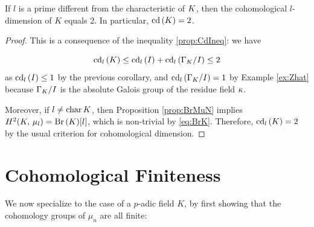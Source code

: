 \documentclass[a4paper, oneside]{memoir}
\begin{document}
\begin{theorem}\label{thm:CohomFin}
	If $l$ is a prime different from the characteristic of $K$, then the cohomological $l$-dimension of $K$ equals 2. In particular, $\operatorname{cd}{(K)}=2$.
\end{theorem}

\begin{proof}
	This is a consequence of the inequality \ref{prop:CdIneq}: we have

	\[
		\operatorname{cd}_l{(K)}\leq \operatorname{cd}_l{(I)}+\operatorname{cd}_l{(\Gamma_K / I)} \leq 2
	\]
	as $\operatorname{cd}_l{(I)}\leq 1$ by the previous corollary, and $\operatorname{cd}_l{(\Gamma_K / I)} = 1$ by Example \ref{ex:Zhat} because $\Gamma_K / I$ is the absolute Galois group of the residue
	field $\kappa$.

	Moreover, if $l\neq \operatorname{char}{K}$, then Proposition \ref{prop:BrMuN} implies $H^{2}( K, \, \mu_l )=\operatorname{Br}{(K)}[l]$, which is non-trivial by \eqref{eq:BrK}. Therefore, $\operatorname{cd}_l{(K)}=2$ by the usual criterion for cohomological dimension.
\end{proof}

\section{Cohomological Finiteness}

We now specialize to the case of a $p$-adic field $K$, by first showing that the cohomology groups of $\mu_n$ are all finite:
\end{document}
